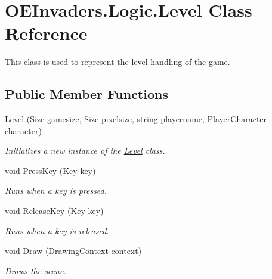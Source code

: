 \hypertarget{class_o_e_invaders_1_1_logic_1_1_level}{}\section{O\+E\+Invaders.\+Logic.\+Level Class Reference}
\label{class_o_e_invaders_1_1_logic_1_1_level}


This class is used to represent the level handling of the game.  


\subsection*{Public Member Functions}
\begin{DoxyCompactItemize}
\item 
\mbox{\hyperlink{class_o_e_invaders_1_1_logic_1_1_level_a0c394590bc1cc859545777462a5be549}{Level}} (Size gamesize, Size pixelsize, string playername, \mbox{\hyperlink{namespace_o_e_invaders_1_1_library_ad161194088b9101570c071d1baa1d2c7}{Player\+Character}} character)
\begin{DoxyCompactList}\small\item\em Initializes a new instance of the \mbox{\hyperlink{class_o_e_invaders_1_1_logic_1_1_level}{Level}} class. \end{DoxyCompactList}\item 
void \mbox{\hyperlink{class_o_e_invaders_1_1_logic_1_1_level_aedff2825d8a03a6a89c125b7e6768d04}{Press\+Key}} (Key key)
\begin{DoxyCompactList}\small\item\em Runs when a key is pressed. \end{DoxyCompactList}\item 
void \mbox{\hyperlink{class_o_e_invaders_1_1_logic_1_1_level_acb1b2317e86246597e12a98705c17659}{Release\+Key}} (Key key)
\begin{DoxyCompactList}\small\item\em Runs when a key is released. \end{DoxyCompactList}\item 
void \mbox{\hyperlink{class_o_e_invaders_1_1_logic_1_1_level_ab848f3b2e1584df5e565d86c69697345}{Draw}} (Drawing\+Context context)
\begin{DoxyCompactList}\small\item\em Draws the scene. \end{DoxyCompactList}\end{DoxyCompactItemize}
